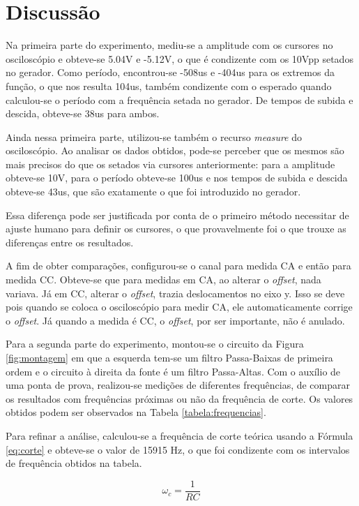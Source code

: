 \documentclass{article}
\begin{document}
\section{Discussão}
Na primeira parte do experimento, mediu-se a amplitude com os cursores no osciloscópio e obteve-se 5.04V e -5.12V, o que é condizente com os 10Vpp setados no gerador.
Como período, encontrou-se -508us e -404us para os extremos da função, o que nos resulta 104us, também condizente com o esperado quando calculou-se o período com a frequência setada no gerador. 
De tempos de subida e descida, obteve-se 38us para ambos.

Ainda nessa primeira parte, utilizou-se também o recurso \emph{measure} do osciloscópio. Ao analisar os dados obtidos, pode-se perceber que os mesmos são mais precisos do que os setados via cursores anteriormente: para a amplitude obteve-se 10V, para o período obteve-se 100us e nos tempos de subida e descida obteve-se 43us, que são exatamente o que foi introduzido no gerador.

Essa diferença pode ser justificada por conta de o primeiro método necessitar de ajuste humano para definir os cursores, o que provavelmente foi o que trouxe as diferenças entre os resultados.

A fim de obter comparações, configurou-se o canal para medida CA e então para medida CC. Obteve-se que para medidas em CA, ao alterar o \emph{offset}, nada variava. Já em CC, alterar o \emph{offset}, trazia deslocamentos no eixo y. Isso se deve pois quando se coloca o osciloscópio para medir CA, ele automaticamente corrige o \emph{offset}. Já quando a medida é CC, o \emph{offset}, por ser importante, não é anulado.

Para a segunda parte do experimento, montou-se o circuito da Figura  \ref{fig:montagem} em que a esquerda tem-se um filtro Passa-Baixas de primeira ordem e o circuito à direita da fonte é um filtro Passa-Altas. Com o auxílio de uma ponta de prova, realizou-se medições de diferentes frequências,  de comparar os resultados com frequências próximas ou não da frequência de corte. Os valores obtidos podem ser observados na Tabela \ref{tabela:frequencias}.

Para refinar a análise, calculou-se a frequência de corte teórica usando a Fórmula \ref{eq:corte} e obteve-se o valor de 15915 Hz, o que foi condizente com os intervalos de frequência obtidos na tabela.

\begin{equation}
    \omega_{c} = \frac{1}{RC}
    \label{eq:corte}
\end{equation}
\end{document}
